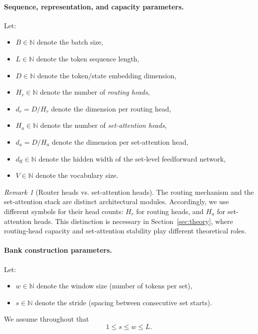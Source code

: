 \documentclass{article}
\theoremstyle{plain}
\theoremstyle{definition}
\theoremstyle{remark}
\newtheorem{remark}[theorem]{Remark}
\begin{document}
\paragraph{Sequence, representation, and capacity parameters.}
Let:
\begin{itemize}
    \item $B \in \mathbb{N}$ denote the batch size,
    \item $L \in \mathbb{N}$ denote the token sequence length,
    \item $D \in \mathbb{N}$ denote the token/state embedding dimension,
    \item $H_r \in \mathbb{N}$ denote the number of \emph{routing heads},
    \item $d_r = D/H_r$ denote the dimension per routing head,
    \item $H_a \in \mathbb{N}$ denote the number of \emph{set-attention heads},
    \item $d_a = D/H_a$ denote the dimension per set-attention head,
    \item $d_{\mathrm{ff}} \in \mathbb{N}$ denote the hidden width of the set-level feedforward network,
    \item $V \in \mathbb{N}$ denote the vocabulary size.
\end{itemize}

\begin{remark}[Router heads vs. set-attention heads]
\label{rem:head-notation}
The routing mechanism and the set-attention stack are distinct architectural modules. Accordingly, we use different symbols for their head counts: $H_r$ for routing heads, and $H_a$ for set-attention heads. This distinction is necessary in Section~\ref{sec:theory}, where routing-head capacity and set-attention stability play different theoretical roles.
\end{remark}

\paragraph{Bank construction parameters.}
Let:
\begin{itemize}
    \item $w \in \mathbb{N}$ denote the window size (number of tokens per set),
    \item $s \in \mathbb{N}$ denote the stride (spacing between consecutive set starts).
\end{itemize}
We assume throughout that
\begin{equation}
\label{eq:ws-order}
1 \le s \le w \le L.
\end{equation}
\end{document}
